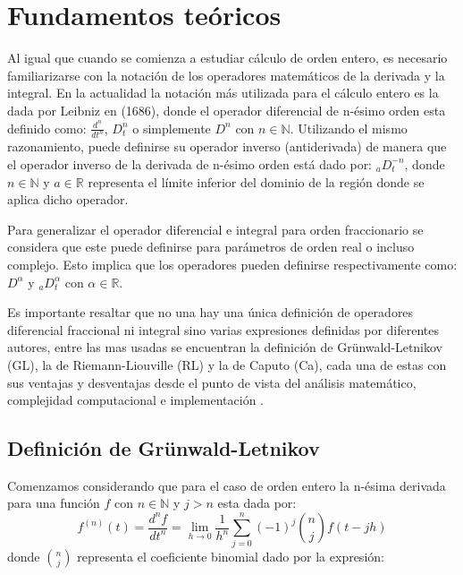 \chapter{Fundamentos teóricos}		

	Al igual que cuando se comienza a estudiar cálculo de orden entero, es necesario familiarizarse con la notación de los operadores matemáticos de la derivada y la integral. En la actualidad la notación más utilizada para el cálculo entero es la dada por Leibniz en (1686), donde el operador diferencial de n-ésimo orden esta definido como: $\frac{d^{n}}{dt^{n}}$, $D_{t}^{n}$ o simplemente $D^{n}$ con $n \in \mathbb{N}$. Utilizando el mismo razonamiento, puede definirse su operador inverso (antiderivada) de manera que el operador inverso de la derivada de n-ésimo orden está dado por: $_{a}D^{-n}_{t}$, donde $n \in \mathbb{N}$ y $a \in \mathbb{R}$ representa el límite inferior del dominio de la región donde se aplica dicho operador.
			
	Para generalizar el operador diferencial e integral para orden fraccionario se considera que este puede definirse para parámetros de orden real o incluso complejo. Esto implica que los operadores pueden definirse respectivamente como: $D^{\alpha}$ y $_{a}D^{\alpha}_{t}$ con $ \alpha \in \mathbb{R}$. 
		
	Es importante resaltar que no una hay una única definición de operadores diferencial fraccional ni integral sino varias expresiones definidas por diferentes autores, entre las mas usadas se encuentran la definición de Grünwald-Letnikov (GL), la de Riemann-Liouville (RL) y la de Caputo (Ca), cada una de estas con sus ventajas y desventajas desde el punto de vista del análisis matemático, complejidad computacional e implementación \cite{Petras2011}.
			
	\section{Definición de Grünwald-Letnikov}

	Comenzamos considerando que para el caso de orden entero la n-ésima derivada para una función $f$ con $n \in \mathbb{N}$ y $j>n$ esta dada por:
	\begin{equation}
		f^{(n)}(t) = \frac{d^{n}f}{dt^{n}} = \lim_{h \to 0 } \frac{1}{h^{n}} \sum_{j = 0}^{n} (-1)^{j} \binom{n}{j} f(t - jh)
		\label{ec:derivada_entera}
	\end{equation}
	donde $\binom{n}{j}$ representa el coeficiente binomial dado por la expresión:
			
